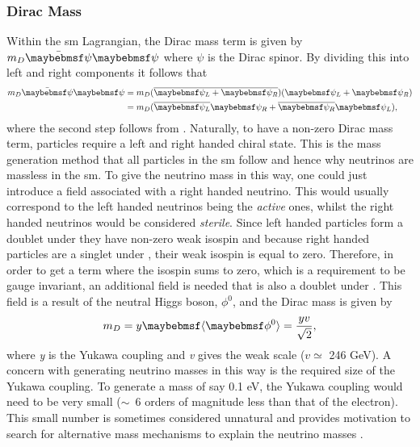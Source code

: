 \subsubsection{Dirac Mass}
Within the \gls{sm} Lagrangian, the Dirac mass term is given by $m_D\Bar{\psi}\psi$ where $\psi$ is the Dirac spinor. By dividing this into left and right components it follows that
\begin{equation}\label{eqn:Dirac mass term}
\begin{split}
    m_D\Bar{\psi}\psi &= m_D(\overline{\psi_L + \psi_R})(\psi_L + \psi_R) \\
    &= m_D(\overline{\psi_L}\psi_R + \overline{\psi_R}\psi_L),
\end{split}
\end{equation} 
where the second step follows from . Naturally, to have a non-zero Dirac mass term, particles require a left and right handed chiral state. This is the mass generation method that all particles in the \gls{sm} follow and hence why neutrinos are massless in the \gls{sm}. To give the neutrino mass in this way, one could just introduce a field associated with a right handed neutrino. This would usually correspond to the left handed neutrinos being the \textit{active} ones, whilst the right handed neutrinos would be considered \textit{sterile}. Since left handed particles form a doublet under  they have non-zero weak isospin and because right handed particles are a singlet under , their weak isospin is equal to zero. Therefore, in order to get a term where the isospin sums to zero, which is a requirement to be gauge invariant, an additional field is needed that is also a doublet under . This field is a result of the neutral Higgs boson, $\phi^0$, and the Dirac mass is given by
\begin{equation}
    m_D = y\braket{\phi^0} = \frac{yv}{\sqrt{2}},
\end{equation}
where \textit{y} is the Yukawa coupling and \textit{v} gives the weak scale ($v \simeq$ 246 GeV). A concern with generating neutrino masses in this way is the required size of the Yukawa coupling. To generate a mass of say 0.1 eV, the Yukawa coupling would need to be very small ($\sim$~6 orders of magnitude less than that of the electron). This small number is sometimes considered unnatural and provides motivation to search for alternative mass mechanisms to explain the neutrino masses \cite{Fundamentals_of_Neutrino_Physics_and_Astrophysics}.

